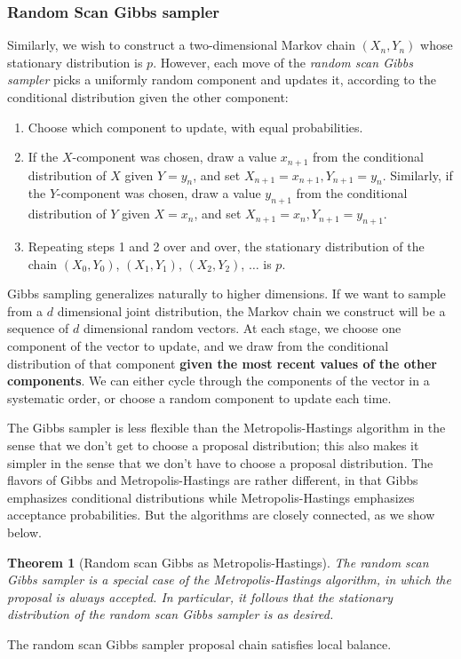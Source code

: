 \documentclass[11pt,a4paper]{article}
\newtheorem{theorem}{Theorem}
\begin{document}
\subsubsection{ Random Scan Gibbs sampler}
Similarly, we wish to construct a two-dimensional Markov chain $(X_n,Y_n)$ whose stationary distribution is $p$. However, each move of the \textit{random scan Gibbs sampler} picks a uniformly random component and updates it, according to the conditional distribution given the other component:
\begin{enumerate}
    \item Choose which component to update, with equal probabilities.
    \item If the $X$-component was chosen, draw a value $x_{n+1}$ from the conditional distribution of $X$ given $Y=y_n$, and set $X_{n+1}=x_{n+1}, Y_{n+1}=y_n$. Similarly, if the $Y$-component was chosen, draw a value $y_{n+1}$ from the conditional distribution of $Y$ given $X=x_n$, and set $X_{n+1}=x_n, Y_{n+1}=y_{n+1}$.
    \item Repeating steps 1 and 2 over and over, the stationary distribution of the chain $\left(X_0, Y_0\right)$, $\left(X_1, Y_1\right)$, $\left(X_2, Y_2\right)$, $\ldots$ is $p$.
\end{enumerate}
Gibbs sampling generalizes naturally to higher dimensions. If we want to sample from a $d$ dimensional joint distribution, the Markov chain we construct will be a sequence of $d$ dimensional random vectors. At each stage, we choose one component of the vector to update, and we draw from the conditional distribution of that component \textbf{given the most recent values of the other components}. We can either cycle through the components of the vector in a systematic order, or choose a random component to update each time.

The Gibbs sampler is less flexible than the Metropolis-Hastings algorithm in the sense that we don't get to choose a proposal distribution; this also makes it simpler in the sense that we don't have to choose a proposal distribution. The flavors of Gibbs and Metropolis-Hastings are rather different, in that Gibbs emphasizes conditional distributions while Metropolis-Hastings emphasizes acceptance probabilities. But the algorithms are closely connected, as we show below.

\begin{theorem}[Random scan Gibbs as Metropolis-Hastings]
    The random scan Gibbs sampler is a special case of the Metropolis-Hastings algorithm, in which the proposal is always accepted. In particular, it follows that the stationary distribution of the random scan Gibbs sampler is as desired.
\end{theorem}
The random scan Gibbs sampler proposal chain satisfies local balance.
\end{document}
